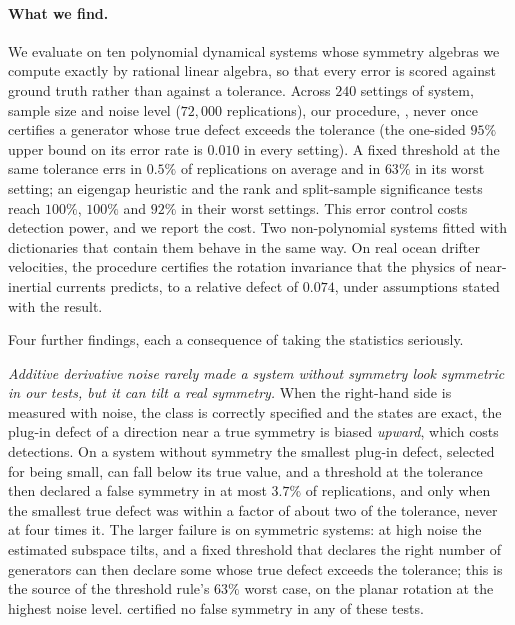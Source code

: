 \paragraph{What we find.} We evaluate on ten polynomial dynamical systems
whose symmetry algebras we compute exactly by rational linear algebra, so that
every error is scored against ground truth rather than against a tolerance.
Across $240$ settings of system, sample size and noise level ($72{,}000$
replications), our
procedure, \symcert, never once certifies a generator whose true defect
exceeds the tolerance (the one-sided $95\%$ upper bound on its error rate is
$0.010$ in every setting). A fixed threshold at the same tolerance errs in
$0.5\%$ of replications on average and in $63\%$ in its worst setting; an
eigengap heuristic and the rank and split-sample significance tests reach
$100\%$, $100\%$ and $92\%$ in their worst settings. This error control costs
detection power, and we report the cost. Two non-polynomial systems fitted
with dictionaries that contain them behave in the same way. On real ocean
drifter velocities, the procedure certifies the rotation invariance that the
physics of near-inertial currents predicts, to a relative defect of $0.074$,
under assumptions stated with the result.

Four further findings, each a consequence of taking the statistics seriously.

\emph{Additive derivative noise rarely made a system without symmetry look
symmetric in our tests, but it can tilt a real symmetry.} When the right-hand side is measured with noise,
the class is correctly specified and the states are exact, the plug-in defect
of a direction near a true symmetry is biased \emph{upward}, which costs
detections. On a system without symmetry the smallest plug-in defect, selected
for being small, can fall below its true value, and a threshold at the
tolerance then declared a false symmetry in at most $3.7\%$ of replications,
and only when the smallest true defect was within a factor of about two of
the tolerance, never at four times it. The larger failure is on symmetric
systems: at high noise the estimated subspace tilts, and a fixed threshold
that declares the right number of generators can then declare some whose true
defect exceeds the tolerance; this is the source of the threshold rule's
$63\%$ worst case, on the planar rotation at the highest noise level.
\symcert{} certified no false symmetry in any of these tests.

